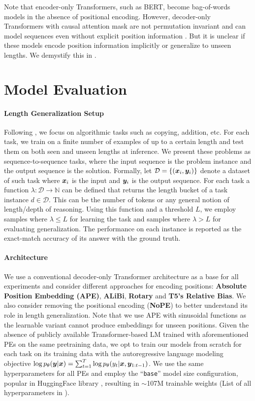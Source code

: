 \documentclass{article}
\begin{document}
Note that encoder-only Transformers, such as BERT, become bag-of-words models in the absence of positional encoding.
However, decoder-only Transformers with causal attention mask are not permutation invariant and can model sequences even without explicit position information \citep{Tsai2019:TransformerDissection}.
But it is unclear if these models encode position information implicitly or generalize to unseen lengths.
We demystify this in .




\section{Model Evaluation}
\label{sec:eval_framework}
\paragraph{Length Generalization Setup}
Following \citet{Anil2022:LengthFailure}, we focus on algorithmic tasks such as copying, addition, etc.
For each task, we train on a finite number of examples of up to a certain length and test them on both seen and unseen lengths at inference.
We present these problems as sequence-to-sequence tasks, where the input sequence is the problem instance and the output sequence is the solution.
Formally, let
$\mathcal{D} = \{({\bm{x}}_i, {\bm{y}}_i)\}$
denote a dataset of such task where ${\bm{x}}_i$ is the input and ${\bm{y}}_i$ is the output sequence.
For each task a function $\lambda: \mathcal{D} \rightarrow \mathbb{N}$ can be defined that returns the length bucket of a task instance $d \in \mathcal{D}$.
This can be the number of tokens or any general notion of length/depth of reasoning.
Using this function and a threshold $L$, we employ samples where $\lambda \le L$ for learning the task and samples where $\lambda > L$ for evaluating generalization.
The performance on each instance is reported as the exact-match accuracy of its answer with the ground truth.
\paragraph{Architecture}
We use a conventional decoder-only Transformer architecture as a base for all experiments and consider different approaches for encoding positions:
\textbf{Absolute Position Embedding (APE)}, \textbf{ALiBi}, \textbf{Rotary} and \textbf{T5's Relative Bias}.
We also consider removing the positional encoding (\textbf{NoPE}) to better understand its role in length generalization.
Note that we use APE with sinusoidal functions \citep{Vaswani2017:Transformer} as the learnable variant cannot produce embeddings for unseen positions.
Given the absence of publicly available Transformer-based LM trained with aforementioned PEs on the same pretraining data, we opt to train our models from scratch for each task on its training data with the autoregressive language modeling objective $\log p_\theta({\bm{y}}|{\bm{x}}) = \sum_{t=1}^{T} \log p_\theta(y_t|{\bm{x}}, {\bm{y}}_{1:t-1})$.
We use the same hyperparameters for all PEs and employ the ``\texttt{base}'' model size configuration, popular in HuggingFace library \citep{Wolf2020:Huggingface}, resulting in $\sim$107M trainable weights (List of all hyperparameters in ).
\end{document}
